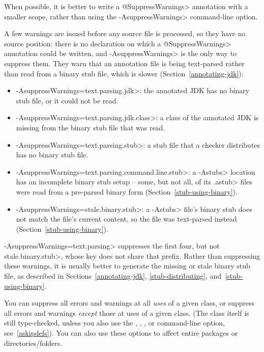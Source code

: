 When possible, it is better to write a \<@SuppressWarnings> annotation with a
smaller scope, rather than using the \<-AsuppressWarnings> command-line option.

A few warnings are issued before any source file is processed, so they have no
source position:  there is no declaration on which a \<@SuppressWarnings>
annotation could be written, and \<-AsuppressWarnings> is the only way to
suppress them.  They warn that an annotation file is being text-parsed rather
than read from a binary stub file, which is slower
(Section~\ref{annotating-jdk}):

\begin{itemize}
\item
  \<-AsuppressWarnings=text.parsing.jdk>:  the annotated JDK has no binary stub
  file, or it could not be read.
\item
  \<-AsuppressWarnings=text.parsing.jdk.class>:  a class of the annotated JDK is
  missing from the binary stub file that was read.
\item
  \<-AsuppressWarnings=text.parsing.stub>:  a stub file that a checker
  distributes has no binary stub file.
\item
  \<-AsuppressWarnings=text.parsing.command.line.stub>:  a \<-Astubs> location has
  an incomplete binary stub setup -- some, but not all, of its \<.astub> files
  were read from a pre-parsed binary form (Section~\ref{stub-using-binary}).
\item
  \<-AsuppressWarnings=stale.binary.stub>:  a \<-Astubs> file's binary stub does
  not match the file's current content, so the file was text-parsed instead
  (Section~\ref{stub-using-binary}).
\end{itemize}

\noindent
\<-AsuppressWarnings=text.parsing> suppresses the first four, but not
\<stale.binary.stub>, whose key does not share that prefix.  Rather than
suppressing these warnings, it is usually better to generate the missing or
stale binary stub file, as described in Sections~\ref{annotating-jdk},
\ref{stub-distributing}, and~\ref{stub-using-binary}.



You can suppress all errors and warnings at all \emph{uses} of a given
class, or suppress all errors and warnings \emph{except} those at uses of a given
class.  (The class itself is still type-checked, unless you also use
the , , , or 
command-line option, see~\ref{askipdefs}).
You can also use these options to affect entire packages or directories/folders.

